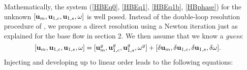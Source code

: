 \documentclass[twocolumn,10pt]{asme2ej}
\begin{document}
Mathematically, the system (\ref{HBEq0}, \ref{HBEq1}, \ref{HBEq1b}, \ref{HBphase}) for the unknown $[{\bf u }_m, {\bf u }_{1,c}, {\bf u }_{1,s}, \omega]$ is well posed. Instead of the double-loop resolution procedure of \cite{MLugo2014}, we propose a direct resolution using a Newton iteration just as explained for the base flow in section 2. 
We then assume that we know a {\em guess}:
$$
[{\bf u }_m, {\bf u }_{1,c}, {\bf u }_{1,s}, \omega] = 
 [{\bf u }_m^g, {\bf u }_{1,c}^g, {\bf u }_{1,s}^g, \omega^g]
+ [\delta {\bf u }_m, \delta {\bf u }_{1,c}, \delta {\bf u }_{1,s}, \delta \omega].
$$
Injecting and developing up to linear order leads to the following equations:
\iffalse
\begin{subequations}\label{eq:harmonic_total}
\begin{eqnarray}
\begin{split}
&{\cal NS}(  {\bf u }_m^g ) - \frac{1}{4} \big[ {\cal C}( {\bf u }_{1,c}^g,{\bf u }_{1,c}^g) +  {\cal C}( {\bf u }_{1,s}^g,{\bf u }_{1,s}^g) \big]+ {\cal LNS}_{{\bf u }_m^g}(\delta {\bf u }_m)
\\
&-\frac{1}{2} \big[ {\cal C}( {\bf u }_{1,c}^g,\delta {\bf u }_{1,c}) +  {\cal C}( {\bf u }_{1,s}^g,\delta {\bf u }_{1,s}) \big] = 0,
\end{split}
\label{HB_1}
\\
\begin{split}
{\cal LNS}_{{\bf u }_m^g}( {\bf u }_{1,c}^g) - \omega^g {\bf u }_{1,s}^g& -  {\cal C}( \delta {\bf u }_{m}, {\bf u }_{1,c}^g)
\\
&+{\cal LNS}_{{\bf u }_m^g}( \delta {\bf u }_{1,c})  - \omega^g \delta {\bf u }_{1,s}  
 - \delta \omega {\bf u }_{1,s}^g = 0 ,
 \end{split}
\label{HB_2}
\\
\begin{split}
{\cal LNS}_{{\bf u }_m^g}({\bf u }_{1,s}^g) + \omega^g {\bf u }_{1,c}^g& -  {\cal C}( \delta {\bf u }_{m}, {\bf u }_{1,s}^g)
\\
&+{\cal LNS}_{{\bf u }_m^g}( \delta {\bf u }_{1,s}) + \omega^g \delta {\bf u }_{1,c} +  \delta \omega {\bf u }_{1,c}^g= 0 ,
\end{split}
\label{HB_3}
\\
\begin{split}
 F_y({\bf u }_{1,s}^g) + F_y(\delta {\bf u }_{1,s}) = 0. \qquad \qquad \qquad \qquad \qquad \qquad \quad
\end{split}
\end{eqnarray}
\end{subequations}
\fi
\end{document}
